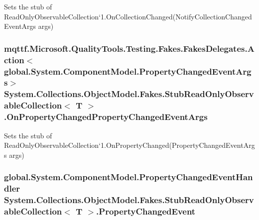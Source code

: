 Sets the stub of Read\-Only\-Observable\-Collection`1.On\-Collection\-Changed(\-Notify\-Collection\-Changed\-Event\-Args args)

\hypertarget{class_system_1_1_collections_1_1_object_model_1_1_fakes_1_1_stub_read_only_observable_collection_3_01_t_01_4_a75b102c4cf3eb66137fcd5eeef918c44}{
\subsubsection[{On\-Property\-Changed\-Property\-Changed\-Event\-Args}]{\setlength{\rightskip}{0pt plus 5cm}mqttf.\-Microsoft.\-Quality\-Tools.\-Testing.\-Fakes.\-Fakes\-Delegates.\-Action$<$global.\-System.\-Component\-Model.\-Property\-Changed\-Event\-Args$>$ System.\-Collections.\-Object\-Model.\-Fakes.\-Stub\-Read\-Only\-Observable\-Collection$<$ T $>$.On\-Property\-Changed\-Property\-Changed\-Event\-Args}}\label{class_system_1_1_collections_1_1_object_model_1_1_fakes_1_1_stub_read_only_observable_collection_3_01_t_01_4_a75b102c4cf3eb66137fcd5eeef918c44}


Sets the stub of Read\-Only\-Observable\-Collection`1.On\-Property\-Changed(\-Property\-Changed\-Event\-Args args)

\hypertarget{class_system_1_1_collections_1_1_object_model_1_1_fakes_1_1_stub_read_only_observable_collection_3_01_t_01_4_afae465e51ed5f9f53512907476fbdb98}{
\subsubsection[{Property\-Changed\-Event}]{\setlength{\rightskip}{0pt plus 5cm}global.\-System.\-Component\-Model.\-Property\-Changed\-Event\-Handler System.\-Collections.\-Object\-Model.\-Fakes.\-Stub\-Read\-Only\-Observable\-Collection$<$ T $>$.Property\-Changed\-Event}}\label{class_system_1_1_collections_1_1_object_model_1_1_fakes_1_1_stub_read_only_observable_collection_3_01_t_01_4_afae465e51ed5f9f53512907476fbdb98}


